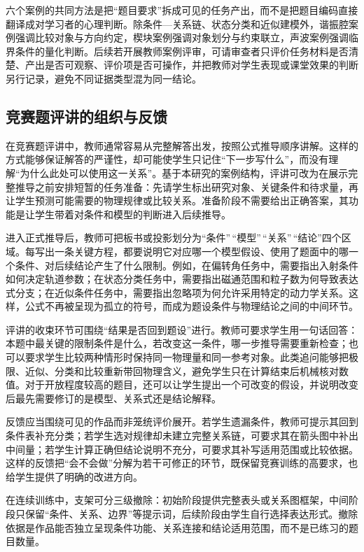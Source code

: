 \documentclass[
  12pt,
  a4paper,twoside,openany]{ctexbook}
\begin{document}
六个案例的共同方法是把``题目要求''拆成可见的任务产出，而不是把题目编码直接翻译成对学习者的心理判断。除条件---关系链、状态分类和近似建模外，谐振腔案例强调比较对象与方向约定，楔块案例强调对象划分与约束联立，声波案例强调临界条件的量化判断。后续若开展教师案例评审，可请审查者只评价任务材料是否清楚、产出是否可观察、评价项是否可操作，并把教师对学生表现或课堂效果的判断另行记录，避免不同证据类型混为同一结论。

\subsection{竞赛题评讲的组织与反馈}\label{ux7adeux8d5bux9898ux8bc4ux8bb2ux7684ux7ec4ux7ec7ux4e0eux53cdux9988}

在竞赛题评讲中，教师通常容易从完整解答出发，按照公式推导顺序讲解。这样的方式能够保证解答的严谨性，却可能使学生只记住``下一步写什么''，而没有理解``为什么此处可以使用这一关系''。基于本研究的案例结构，评讲可改为在展示完整推导之前安排短暂的任务准备：先请学生标出研究对象、关键条件和待求量，再让学生预测可能需要的物理规律或比较关系。准备阶段不需要给出正确答案，其功能是让学生带着对条件和模型的判断进入后续推导。

进入正式推导后，教师可把板书或投影划分为``条件''\,``模型''\,``关系''\,``结论''四个区域。每写出一条关键方程，都要说明它对应哪一个模型假设、使用了题面中的哪一个条件、对后续结论产生了什么限制。例如，在偏转角任务中，需要指出入射条件如何决定轨道参数；在状态分类任务中，需要指出磁通范围和粒子数为何导致表达式分支；在近似条件任务中，需要指出忽略项为何允许采用特定的动力学关系。这样，公式不再被呈现为孤立的符号，而成为题设条件与物理结论之间的中间环节。

评讲的收束环节可围绕``结果是否回到题设''进行。教师可要求学生用一句话回答：本题中最关键的限制条件是什么，若改变这一条件，哪一步推导需要重新检查；也可以要求学生比较两种情形时保持同一物理量和同一参考对象。此类追问能够把极限、近似、分类和比较重新带回物理含义，避免学生只在计算结束后机械核对数值。对于开放程度较高的题目，还可以让学生提出一个可改变的假设，并说明改变后最先需要修订的是模型、关系式还是结论解释。

反馈应当围绕可见的作品而非笼统评价展开。若学生遗漏条件，教师可提示其回到条件表补充分类；若学生选对规律却未建立完整关系链，可要求其在箭头图中补出中间量；若学生计算正确但结论说明不充分，可要求其补写适用范围或比较依据。这样的反馈把``会不会做''分解为若干可修正的环节，既保留竞赛训练的高要求，也给学生提供了明确的改进方向。

在连续训练中，支架可分三级撤除：初始阶段提供完整表头或关系图框架，中间阶段只保留``条件、关系、边界''等提示词，后续阶段由学生自行选择表达形式。撤除依据是作品能否独立呈现条件功能、关系连接和结论适用范围，而不是已练习的题目数量。
\end{document}
